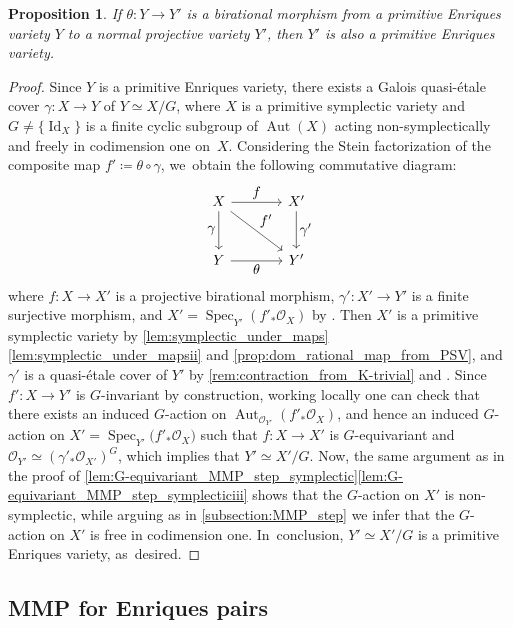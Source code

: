 \documentclass[10pt]{amsart}
\let\ts\textstyle
\theoremstyle{plain}
\newtheorem{prop}[thm]{Proposition}
\theoremstyle{definition}
\newcommand{\OO}{\mathcal{O}}
\DeclareMathOperator{\Id}{Id}
\DeclareMathOperator{\Aut}{Aut}
\DeclareMathOperator{\Spec}{Spec}
\begin{document}
\begin{prop}
\label{prop:PEV_closed_under_bir_contraction}
If $\theta \colon Y\to Y'$ is a birational morphism from a primitive Enriques variety $Y$ to a normal projective variety $Y'$, then $Y'$ is also a primitive Enriques variety.
\end{prop}

\begin{proof}
Since $Y$ is a primitive Enriques variety, there exists a Galois quasi-étale cover $\gamma \colon X \to Y$ of $Y \simeq X / G$, where $X$ is a primitive symplectic variety and $G \neq \{ \Id_X \}$ is a finite cyclic subgroup of $\Aut(X)$ acting non-symplectically and freely in codimension one on~$X$. Considering the Stein factorization of the composite map $f' \coloneqq \theta \circ \gamma$, we~obtain the following commutative diagram:
\[
\begin{tikzcd}[row sep = large, column sep = large]
X \arrow[r, "\ts f"] \arrow[d, "\ts \gamma", swap] \arrow[dr,"\ts f'"]& X' \arrow[d, "\ts \gamma'"] \\
Y \arrow[r, "\ts \theta" swap] & Y'
\end{tikzcd}
\]
where $ f \colon X \to X'$ is a projective birational morphism, $\gamma' \colon X' \to Y'$ is a finite surjective morphism, and $X' = \Spec_{Y'} (f'_* \OO_X)$ by \cite[Prop.\,37.53.4(5)]{Stacks}. Then $X'$ is a primitive symplectic variety by \autoref{lem:symplectic_under_maps}\eqref{lem:symplectic_under_mapsii} and \autoref{prop:dom_rational_map_from_PSV}, and $\gamma'$ is a quasi-étale cover of $Y'$ by \autoref{rem:contraction_from_K-trivial} and \cite[\S1.41]{Debarre01book}.
Since $f' \colon X \to Y'$ is $G$\nobreakdash-invariant by construction, working locally one can check that there exists an induced $G$\nobreakdash-action on $\Aut_{\OO_{Y'}} (f'_* \OO_X)$, and hence an induced $G$\nobreakdash-action on $X' = \Spec_{Y'} \bigl(f'_* \OO_X \bigr)$ such that $f \colon X \to X'$ is $G$\nobreakdash-equivariant and $\OO_{Y'}\simeq (\gamma'_* \OO_{X'})^G$, which implies that $Y' \simeq X'/G$.
Now, the same argument as in the proof of \autoref{lem:G-equivariant_MMP_step_symplectic}\eqref{lem:G-equivariant_MMP_step_symplecticiii} shows that the $G$\nobreakdash-action on $X'$ is non-symplectic, while arguing as in \autoref{subsection:MMP_step} we infer that the $G$\nobreakdash-action on $X'$ is free in codimension one. In~conclusion, $Y' \simeq X'/G$ is a primitive Enriques variety, as~desired.
\end{proof}

\subsection{MMP for Enriques pairs}
\label{subsection:MMP_Enriques}
\end{document}
